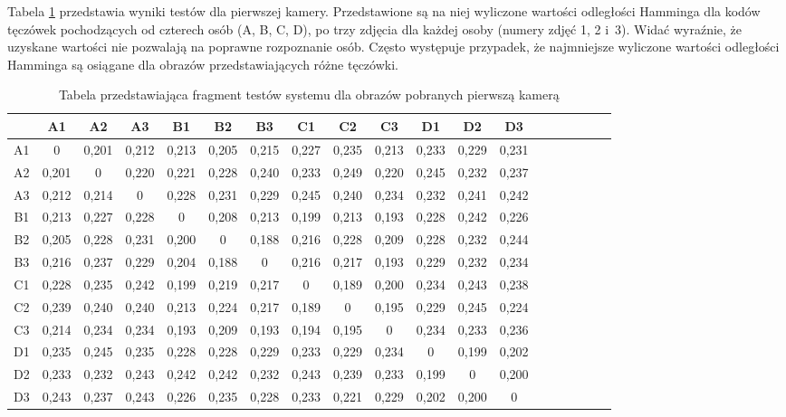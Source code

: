 Tabela \ref{tab:pierwsza} przedstawia wyniki testów dla pierwszej kamery. Przedstawione są na niej wyliczone wartości odległości Hamminga dla kodów tęczówek pochodzących od czterech osób (A, B, C, D), po trzy zdjęcia dla każdej osoby (numery zdjęć 1, 2 i~3). Widać wyraźnie, że uzyskane wartości nie pozwalają na poprawne rozpoznanie osób. Często występuje przypadek, że najmniejsze wyliczone wartości odległości Hamminga są osiągane dla obrazów przedstawiających różne tęczówki.

\begin{table}
\begin{center}
\caption{Tabela przedstawiająca fragment testów systemu dla obrazów pobranych pierwszą kamerą}
\label{tab:pierwsza}
\begin{tabular}{|c|c|c|c|c|c|c|c|c|c|c|c|c|c|c|c|c|c|c|}
\hline
 & A1 & A2 & A3 & B1 & B2 & B3 & C1 & C2 & C3 & D1 & D2 & D3\\ \hline
A1 & 0&0,201&0,212&0,213&0,205&0,215&0,227&0,235&0,213&0,233&0,229&0,231 \\ \hline
A2 & 0,201&0&0,220&0,221&0,228&0,240&0,233&0,249&0,220&0,245&0,232&0,237 \\ \hline
A3 & 0,212&0,214&0&0,228&0,231&0,229&0,245&0,240&0,234&0,232&0,241&0,242\\ \hline
B1 & 0,213&0,227&0,228&0&0,208&0,213&0,199&0,213&0,193&0,228&0,242&0,226\\ \hline
B2 & 0,205&0,228&0,231&0,200&0&0,188&0,216&0,228&0,209&0,228&0,232&0,244\\ \hline
B3 & 0,216&0,237&0,229&0,204&0,188&0&0,216&0,217&0,193&0,229&0,232&0,234\\ \hline
C1 & 0,228&0,235&0,242&0,199&0,219&0,217&0&0,189&0,200&0,234&0,243&0,238\\ \hline
C2 & 0,239&0,240&0,240&0,213&0,224&0,217&0,189&0&0,195&0,229&0,245&0,224\\ \hline
C3 & 0,214&0,234&0,234&0,193&0,209&0,193&0,194&0,195&0&0,234&0,233&0,236\\ \hline
D1 & 0,235&0,245&0,235&0,228&0,228&0,229&0,233&0,229&0,234&0&0,199&0,202\\ \hline
D2 & 0,233&0,232&0,243&0,242&0,242&0,232&0,243&0,239&0,233&0,199&0&0,200\\ \hline
D3 & 0,243&0,237&0,243&0,226&0,235&0,228&0,233&0,221&0,229&0,202&0,200&0\\ \hline
\end{tabular}
\end{center}
\end{table}

